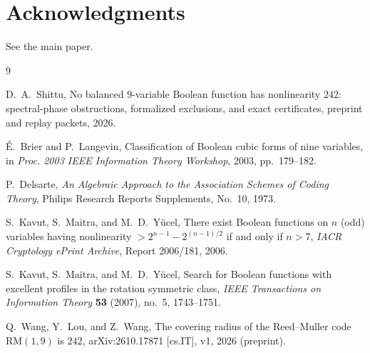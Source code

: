\documentclass[11pt]{article}
\theoremstyle{definition}
\theoremstyle{remark}
\DeclareRobustCommand{\_}{\textunderscore\allowbreak}
\begin{document}
\section*{Acknowledgments}
See the main paper.

\begin{thebibliography}{9}

D.~A.~Shittu,
No balanced $9$-variable Boolean function has nonlinearity $242$: spectral-phase obstructions, formalized exclusions, and exact certificates,
preprint and replay packets, 2026.

\'E.~Brier and P.~Langevin,
Classification of Boolean cubic forms of nine variables,
in \emph{Proc. 2003 IEEE Information Theory Workshop}, 2003, pp.~179--182.

P.~Delsarte,
\emph{An Algebraic Approach to the Association Schemes of Coding Theory},
Philips Research Reports Supplements, No.~10, 1973.

S.~Kavut, S.~Maitra, and M.~D.~Y\"ucel,
There exist Boolean functions on $n$ (odd) variables having nonlinearity $> 2^{n-1} - 2^{(n-1)/2}$ if and only if $n > 7$,
\emph{IACR Cryptology ePrint Archive}, Report 2006/181, 2006.

S.~Kavut, S.~Maitra, and M.~D.~Y\"ucel,
Search for Boolean functions with excellent profiles in the rotation symmetric class,
\emph{IEEE Transactions on Information Theory} \textbf{53} (2007), no.~5, 1743--1751.

Q.~Wang, Y.~Lou, and Z.~Wang,
The covering radius of the Reed--Muller code $\mathrm{RM}(1,9)$ is $242$,
arXiv:2610.17871 [cs.IT], v1, 2026 (preprint).

\end{thebibliography}
\end{document}

